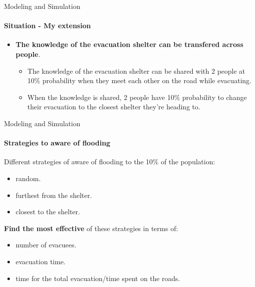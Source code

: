 \documentclass{beamer}
\begin{document}
\begin{frame}[fragile]{Modeling and Simulation}
\framesubtitle{Situation - My extension}
\begin{itemize}
\item \textbf{The knowledge of the evacuation shelter can be transfered across people}.
\begin{itemize}
    \item The knowledge of the evacuation shelter can be shared with 2 people at 10\% probability when they meet each other on the road while evacuating.
    \item When the knowledge is shared, 2 people have 10\% probability to change their evacuation to the closest shelter they're heading to.
\end{itemize}
\end{itemize}
\end{frame}

\begin{frame}[fragile]{Modeling and Simulation}
\framesubtitle{Strategies to aware of flooding}

Different strategies of aware of flooding to the 10\% of the population:
\begin{itemize}
    \item random.
    \item furthest from the shelter.
    \item closest to the shelter.
\end{itemize}

\textbf{Find the most effective} of these strategies in terms of:
\begin{itemize}
    \item number of evacuees.
    \item evacuation time.
    \item time for the total evacuation/time spent on the roads.
\end{itemize}
\end{frame}




\end{document}
